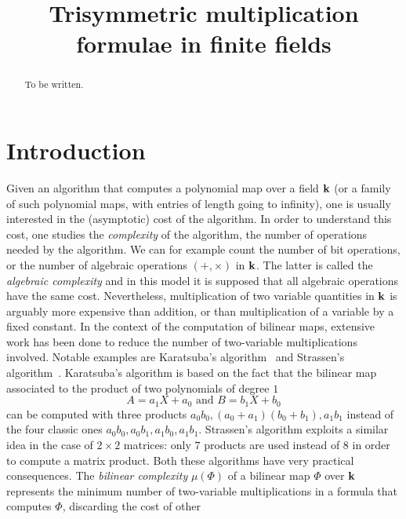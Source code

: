\documentclass[11pt]{article}
\title{Trisymmetric multiplication formulae in finite fields}
\author{}
\begin{document}
\maketitle

\begin{abstract}
  To be written.
\end{abstract}


\section{Introduction}
\label{sec:intro}

Given an algorithm that computes a polynomial map over a field $\mathbf{k}$
(or a family of such polynomial maps, with entries of length going to infinity),
one is
usually interested in the (asymptotic) cost of the algorithm. In order to
understand this cost, one studies the \emph{complexity} of the algorithm, \ie
the number of operations needed by the algorithm. We can for example count the number
of bit operations, or the number of algebraic operations $(+, \times)$ in $\mathbf{k}$. The latter is called the \emph{algebraic complexity}
and in this model it is supposed that all algebraic operations have the same cost.
Nevertheless, multiplication of two variable quantities in $\mathbf{k}$ is arguably more expensive than
addition, or than multiplication of a variable by a fixed constant. In the context of the computation of
bilinear maps, extensive work has been done to reduce the number of
two-variable multiplications involved. Notable examples are Karatsuba's
algorithm~\cite{Karatsuba63} and
Strassen's algorithm~\cite{Strassen69}. Karatsuba's algorithm is
based on the fact that the bilinear map associated to the product of two
polynomials of degree $1$
\[
  A = a_1 X + a_0\text{ and }B = b_1 X + b_0
\]
can be computed with three products $a_0b_0, (a_0+a_1)(b_0+b_1), a_1b_1$ instead
of the four classic ones $a_0b_0, a_0b_1, a_1b_0, a_1b_1$. Strassen's algorithm
exploits a similar idea in the case of $2\times2$ matrices: only $7$ products
are used instead of $8$ in order to compute a matrix product. Both these
algorithms have very practical consequences. The \emph{bilinear complexity}
$\mu(\Phi)$ of a bilinear map $\Phi$ over $\mathbf{k}$ represents the minimum number of two-variable
multiplications in a formula that computes $\Phi$, discarding the cost of other
\end{document}
